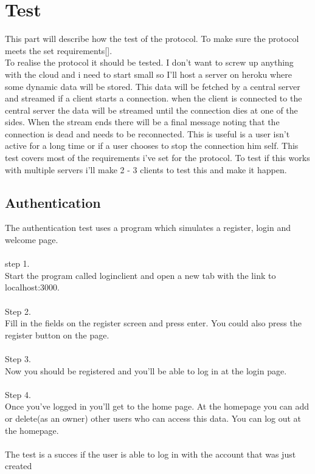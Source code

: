 \documentclass{article}
\begin{document}
\section{Test}\label{sec:test}
This part will describe how the test of the protocol. To make sure the protocol meets the set requirements[\pageref{sec:requirements}].\\
To realise the protocol it should be tested. I don't want to screw up anything with the cloud and i need to start small so I'll host a server on heroku where some dynamic data will be stored. This data will be fetched by a central server and streamed if a client starts a connection. when the client is connected to the central server the data will be streamed until the connection dies at one of the sides. When the stream ends there will be a final message noting that the connection is dead and needs to be reconnected. This is useful is a user isn't active for a long time or if a user chooses to stop the connection him self. This test covers most of the requirements i've set for the protocol. To test if this works with multiple servers i'll make 2 - 3 clients to test this and make it happen. \\

\subsection{Authentication}\label{authentication}
The authentication test uses a program which simulates a register, login and welcome page. \\
\\
step 1.
\\
Start the program called loginclient and open a new tab with the link to localhost:3000.\\
\\
Step 2.
\\
Fill in the fields on the register screen and press enter. You could also press the register button on the page. \\
\\
Step 3. \\
Now you should be registered and you'll be able to log in at the login page. \\
\\
Step 4.\\
Once you've logged in you'll get to the home page. At the homepage you can add or delete(as an owner) other users who can access this data. You can log out at the homepage.\\
\\
The test is a succes if the user is able to log in with the account that was just created
\end{document}
